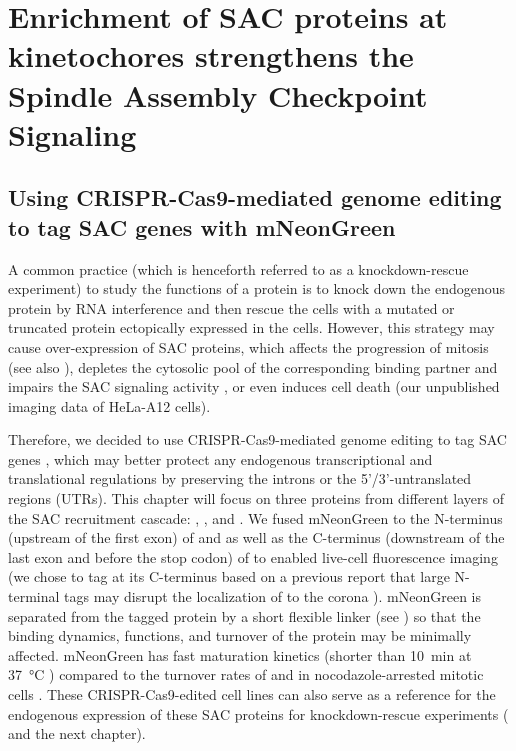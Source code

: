 \chapter{Enrichment of SAC proteins at kinetochores strengthens the Spindle Assembly Checkpoint Signaling}
\label{chpt:3}

\section{Using CRISPR-Cas9-mediated genome editing to tag SAC genes with mNeonGreen }

A common practice (which is henceforth referred to as a knockdown-rescue experiment) to study the functions of a protein is to knock down the endogenous protein by RNA interference and then rescue the cells with a mutated or truncated protein ectopically expressed in the cells.
However, this strategy may cause over-expression of SAC proteins, which affects the progression of mitosis \cite{Bub1Overexpression-AuroraBHyperactivation} (see also ), depletes the cytosolic pool of the corresponding binding partner and impairs the SAC signaling activity \cite{Bub3Competition, FissionYeastSACRobustness, ATMPhosphorylatesMad1S214, MAD1Overexpression_Ryan2012}, or even induces cell death (our unpublished imaging data of HeLa-A12 cells).

Therefore, we decided to use CRISPR-Cas9-mediated genome editing to tag SAC genes  \cite{HDRTiming}, which may better protect any endogenous transcriptional and translational regulations by preserving the introns or the 5'/3'-untranslated regions (UTRs). This chapter will focus on three proteins from different layers of the SAC recruitment cascade: , , and . We fused mNeonGreen to the N-terminus (upstream of the first exon) of  and  as well as the C-terminus (downstream of the last exon and before the stop codon) of  to enabled live-cell fluorescence imaging (we chose to tag  at its C-terminus based on a previous report that large N-terminal tags may disrupt the localization of  to the corona \cite{CoronaActivatesSAC}). mNeonGreen is separated from the tagged protein by a short flexible linker (see ) so that the binding dynamics, functions, and turnover of the protein may be minimally affected. mNeonGreen has fast maturation kinetics (shorter than \SI{10}{min} at \SI{37}{\celsius} \cite{mNG}) compared to the turnover rates of  and  in nocodazole-arrested mitotic cells \cite{BubR1MitosisTurnover, Bub1MitosisTurnover}. These CRISPR-Cas9-edited cell lines can also serve as a reference for the endogenous expression of these SAC proteins for knockdown-rescue experiments ( and the next chapter).

